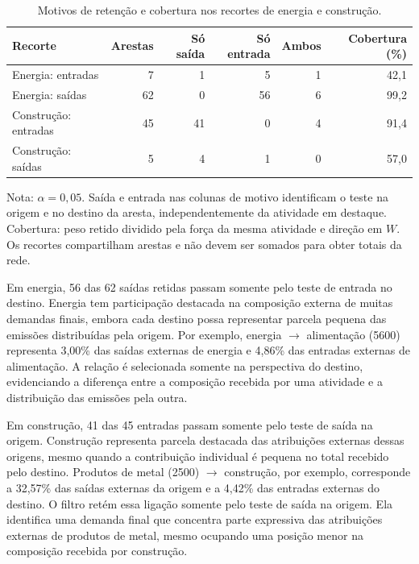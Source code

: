 \begin{table}[htbp]
\centering
\caption{Motivos de retenção e cobertura nos recortes de energia e construção.}
\label{tab:motivos-casos}
\small
\begin{tabular}{@{}lrrrrr@{}}
\toprule
Recorte & Arestas & Só saída & Só entrada & Ambos & Cobertura (\%) \\
\midrule
Energia: entradas & 7 & 1 & 5 & 1 & 42,1 \\
Energia: saídas & 62 & 0 & 56 & 6 & 99,2 \\
Construção: entradas & 45 & 41 & 0 & 4 & 91,4 \\
Construção: saídas & 5 & 4 & 1 & 0 & 57,0 \\
\bottomrule
\end{tabular}
\begin{notas}
Nota: $\alpha=0{,}05$. Saída e entrada nas colunas de motivo identificam o teste na origem e no destino da aresta, independentemente da atividade em destaque. Cobertura: peso retido dividido pela força da mesma atividade e direção em $W$. Os recortes compartilham arestas e não devem ser somados para obter totais da rede.
\end{notas}
\end{table}

Em energia, 56 das 62 saídas retidas passam somente pelo teste de entrada no destino. Energia tem participação destacada na composição externa de muitas demandas finais, embora cada destino possa representar parcela pequena das emissões distribuídas pela origem. Por exemplo, energia $\rightarrow$ alimentação (5600) representa 3,00\% das saídas externas de energia e 4,86\% das entradas externas de alimentação. A relação é selecionada somente na perspectiva do destino, evidenciando a diferença entre a composição recebida por uma atividade e a distribuição das emissões pela outra.

Em construção, 41 das 45 entradas passam somente pelo teste de saída na origem. Construção representa parcela destacada das atribuições externas dessas origens, mesmo quando a contribuição individual é pequena no total recebido pelo destino. Produtos de metal (2500) $\rightarrow$ construção, por exemplo, corresponde a 32,57\% das saídas externas da origem e a 4,42\% das entradas externas do destino. O filtro retém essa ligação somente pelo teste de saída na origem. Ela identifica uma demanda final que concentra parte expressiva das atribuições externas de produtos de metal, mesmo ocupando uma posição menor na composição recebida por construção.

